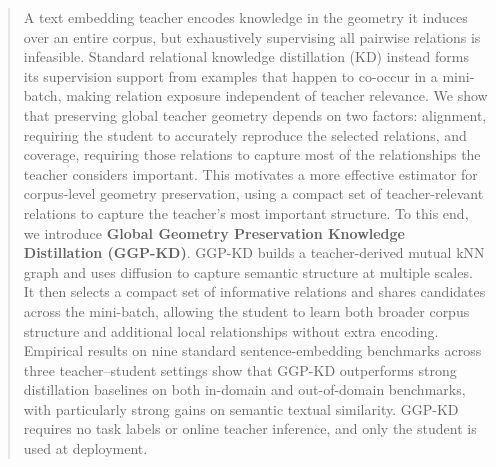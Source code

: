 \begin{abstract}
A text embedding teacher encodes knowledge in the geometry it induces over an entire corpus, but exhaustively supervising all pairwise relations is infeasible. Standard relational knowledge distillation (KD) instead forms its supervision support from examples that happen to co-occur in a mini-batch, making relation exposure independent of teacher relevance. We show that preserving global teacher geometry depends on two factors: alignment, requiring the student to accurately reproduce the selected relations, and coverage, requiring those relations to capture most of the relationships the teacher considers important. This motivates a more effective estimator for corpus-level geometry preservation, using a compact set of teacher-relevant relations to capture the teacher's most important structure. To this end, we introduce \textbf{Global Geometry Preservation Knowledge Distillation (GGP-KD)}. GGP-KD builds a teacher-derived mutual kNN graph and uses diffusion to capture semantic structure at multiple scales. It then selects a compact set of informative relations and shares candidates across the mini-batch, allowing the student to learn both broader corpus structure and additional local relationships without extra encoding. Empirical results on nine standard sentence-embedding benchmarks across three teacher--student settings show that GGP-KD outperforms strong distillation baselines on both in-domain and out-of-domain benchmarks, with particularly strong gains on semantic textual similarity. GGP-KD requires no task labels or online teacher inference, and only the student is used at deployment.
\end{abstract}
